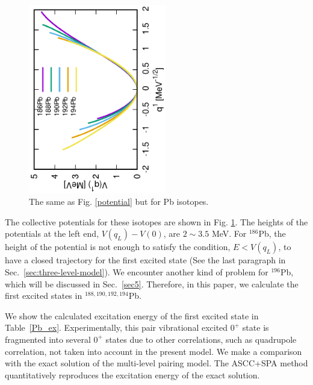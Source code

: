 \documentclass[11pt]{book} %
\begin{document}
\begin{figure}[bt]
 \begin{center}
  \includegraphics[width=60mm,angle=-90]{images/Pbpotential.eps}
 \end{center}
	\caption{The same as Fig. \ref{potential} but for Pb isotopes.
}
 \label{Pb_potential}
\end{figure}
The collective potentials for these isotopes are shown
in Fig. \ref{Pb_potential}.
The heights of the potentials at the left end, $V(q_L)-V(0)$,
are $2\sim3.5$ MeV.
For $^{186}$Pb, the height of the potential is not
enough to satisfy the condition, $E<V(q_L)$,
to have a closed trajectory for the first excited state
(See the last paragraph in Sec.~\ref{sec:three-level-model}).
We encounter another kind of problem for $^{196}$Pb,
which will be discussed in Sec.~\ref{sec5}.
Therefore, in this paper, we calculate the first excited states
in $^{188,190,192,194}$Pb.


We show the calculated excitation energy of the first excited state
in Table~\ref{Pb_ex}.
Experimentally, this pair vibrational excited $0^+$ state is
fragmented into several $0^+$ states due to other correlations,
such as quadrupole correlation, not taken into account in the present model.
We make a comparison with the exact solution of the multi-level
pairing model.
The ASCC+SPA method quantitatively reproduces the excitation energy of
the exact solution.
\end{document}
